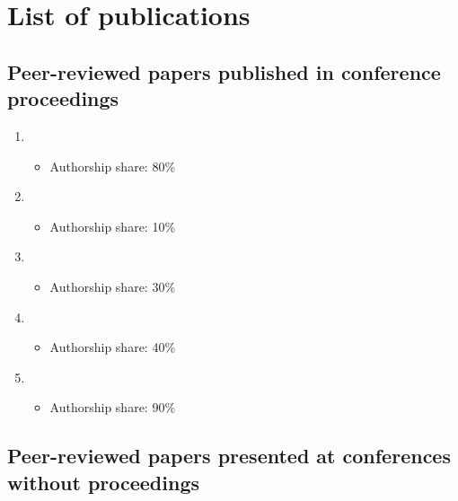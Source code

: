 \chapter*{List of publications}

\preto{}

\section*{Peer-reviewed papers published in conference proceedings}

\begin{enumerate}
	\item{}
		\begin{itemize}
			\item Authorship share: 80\%
		\end{itemize}
	\item{}
		\begin{itemize}
			\item Authorship share: 10\%
		\end{itemize}
	\item{}
		\begin{itemize}
			\item Authorship share: 30\%
		\end{itemize}
	\item{}
		\begin{itemize}
			\item Authorship share: 40\%
		\end{itemize}
	\item{}
		\begin{itemize}
			\item Authorship share: 90\%
		\end{itemize}
\end{enumerate}

\section*{Peer-reviewed papers presented at conferences without proceedings}

